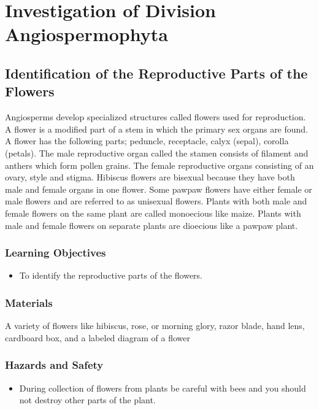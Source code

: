 \section{Investigation of Division Angiospermophyta}

\subsection{Identification of the Reproductive Parts of the Flowers}
Angiosperms develop specialized structures called flowers used for reproduction. A flower is a modified part of a stem in which the primary sex organs are found. A flower has the following parts; peduncle, receptacle, calyx (sepal), corolla (petals). The male reproductive organ called the stamen consists of filament and anthers which form pollen grains. The female reproductive organs consisting of an ovary, style and stigma. Hibiscus flowers are bisexual because they have both male and female organs in one flower. Some pawpaw flowers have either female or male flowers and are referred to as unisexual flowers. Plants with both male and female flowers on the same plant are called monoecious like maize. Plants with male and female flowers on separate plants are dioecious like a pawpaw plant.

\subsubsection*{Learning Objectives}
\begin{itemize}
\item{To identify the reproductive parts of the flowers.}
\end{itemize}

\subsubsection*{Materials}
A variety of flowers like hibiscus, rose, or morning glory, razor blade, hand lens, cardboard box, and a labeled diagram of a flower

\subsubsection*{Hazards and Safety}
\begin{itemize}
\item{During collection of flowers from plants be careful with bees and you should not destroy other parts of the plant.}
\end{itemize}

